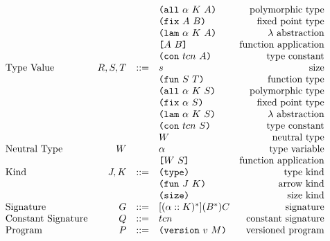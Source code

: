 \documentclass[../plutus-core-specification.tex]{subfiles}
\begin{document}
\begin{minipage}{\linewidth}
\[\begin{array}{lrclr}
                                  &        &     & \texttt{(} \texttt{all} ~ \alpha ~ K ~ A \texttt{)}        & \textrm{polymorphic type}\\
                                  &        &     & \texttt{(} \texttt{fix} ~ A ~ B \texttt{)}                & \textrm{fixed point type}\\
                                  &        &     & \texttt{(} \texttt{lam} ~ \alpha ~ K ~ A \texttt{)}        & \textrm{$\lambda$ abstraction}\\
                                  &        &     & \texttt{[} A ~ B \texttt{]}                & \textrm{function application}\\
                                  &        &     & \texttt{(} \texttt{con} ~ tcn ~ A \texttt{)}          & \textrm{type constant}\\
        \textrm{Type Value}       & R,S,T  & ::= & s                          & \textrm{size}\\
                                  &        &     & \texttt{(} \texttt{fun} ~ S ~ T \texttt{)}                & \textrm{function type}\\
                                  &        &     & \texttt{(} \texttt{all} ~ \alpha ~ K ~ S \texttt{)}        & \textrm{polymorphic type}\\
                                  &        &     & \texttt{(} \texttt{fix} ~ \alpha ~ S \texttt{)}           & \textrm{fixed point type}\\
                                  &        &     & \texttt{(} \texttt{lam} ~ \alpha ~ K ~ S \texttt{)}        & \textrm{$\lambda$ abstraction}\\
                                  &        &     & \texttt{(} \texttt{con} ~ tcn ~ S \texttt{)}          & \textrm{type constant}\\
                                  &        &     & W                          & \textrm{neutral type}\\
        \textrm{Neutral Type}     & W      &     & \alpha                     & \textrm{type variable}\\
                                  &        &     & \texttt{[} W ~ S \texttt{]}                & \textrm{function application}\\
        \textrm{Kind}             & J,K    & ::= & \texttt{(} \texttt{type} \texttt{)}{}                   & \textrm{type kind}\\
                                  &        &     & \texttt{(} \texttt{fun} ~ J ~ K \texttt{)}                & \textrm{arrow kind}\\
                                  &        &     & \texttt{(} \texttt{size} \texttt{)}{}                   & \textrm{size kind}\\
        \textrm{Signature}        & G      & ::= & [(\alpha :: K)^*](B^*)C     & \textrm{signature}\\
        \textrm{Constant Signature}   & Q      & ::= & tcn                        & \textrm{constant signature}\\
        \textrm{Program}          & P      & ::= & \texttt{(} \texttt{version} ~ v ~ M \texttt{)}             & \textrm{versioned program}\\

    \end{array}\]
    \label{fig:Plutus_core_grammar}
\end{minipage}
\end{document}
